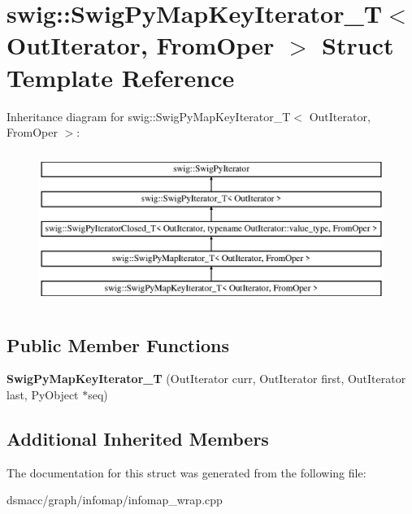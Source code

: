 \hypertarget{structswig_1_1SwigPyMapKeyIterator__T}{}\section{swig\+:\+:Swig\+Py\+Map\+Key\+Iterator\+\_\+T$<$ Out\+Iterator, From\+Oper $>$ Struct Template Reference}
\label{structswig_1_1SwigPyMapKeyIterator__T}
Inheritance diagram for swig\+:\+:Swig\+Py\+Map\+Key\+Iterator\+\_\+T$<$ Out\+Iterator, From\+Oper $>$\+:\begin{figure}[H]
\begin{center}
\leavevmode
\includegraphics[height=5.000000cm]{structswig_1_1SwigPyMapKeyIterator__T}
\end{center}
\end{figure}
\subsection*{Public Member Functions}
\begin{DoxyCompactItemize}
\item 
\mbox{\label{structswig_1_1SwigPyMapKeyIterator__T_ac666b974a2e029753404d74665590daf}} 
{\bfseries Swig\+Py\+Map\+Key\+Iterator\+\_\+T} (Out\+Iterator curr, Out\+Iterator first, Out\+Iterator last, Py\+Object $\ast$seq)
\end{DoxyCompactItemize}
\subsection*{Additional Inherited Members}


The documentation for this struct was generated from the following file\+:\begin{DoxyCompactItemize}
\item 
dsmacc/graph/infomap/infomap\+\_\+wrap.\+cpp\end{DoxyCompactItemize}
